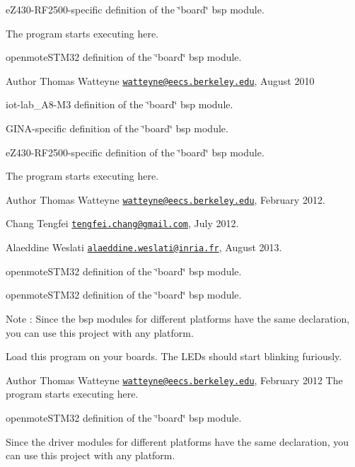 e\+Z430-\/\+R\+F2500-\/specific definition of the \char`\"{}board\char`\"{} bsp module.

The program starts executing here.

openmote\+S\+T\+M32 definition of the \char`\"{}board\char`\"{} bsp module.

\begin{DoxyAuthor}{Author}
Thomas Watteyne \href{mailto:watteyne@eecs.berkeley.edu}{\tt watteyne@eecs.\+berkeley.\+edu}, August 2010
\end{DoxyAuthor}
iot-\/lab\+\_\+\+A8-\/\+M3 definition of the \char`\"{}board\char`\"{} bsp module.

G\+I\+N\+A-\/specific definition of the \char`\"{}board\char`\"{} bsp module.

e\+Z430-\/\+R\+F2500-\/specific definition of the \char`\"{}board\char`\"{} bsp module.

The program starts executing here.

\begin{DoxyAuthor}{Author}
Thomas Watteyne \href{mailto:watteyne@eecs.berkeley.edu}{\tt watteyne@eecs.\+berkeley.\+edu}, February 2012. 

Chang Tengfei \href{mailto:tengfei.chang@gmail.com}{\tt tengfei.\+chang@gmail.\+com}, July 2012. 

Alaeddine Weslati \href{mailto:alaeddine.weslati@inria.fr}{\tt alaeddine.\+weslati@inria.\+fr}, August 2013.
\end{DoxyAuthor}
openmote\+S\+T\+M32 definition of the \char`\"{}board\char`\"{} bsp module.

openmote\+S\+T\+M32 definition of the \char`\"{}board\char`\"{} bsp module.

\begin{DoxyNote}{Note}
\+: Since the bsp modules for different platforms have the same declaration, you can use this project with any platform.
\end{DoxyNote}
Load this program on your boards. The L\+E\+Ds should start blinking furiously.

\begin{DoxyAuthor}{Author}
Thomas Watteyne \href{mailto:watteyne@eecs.berkeley.edu}{\tt watteyne@eecs.\+berkeley.\+edu}, February 2012 The program starts executing here.
\end{DoxyAuthor}
openmote\+S\+T\+M32 definition of the \char`\"{}board\char`\"{} bsp module.

Since the driver modules for different platforms have the same declaration, you can use this project with any platform.

